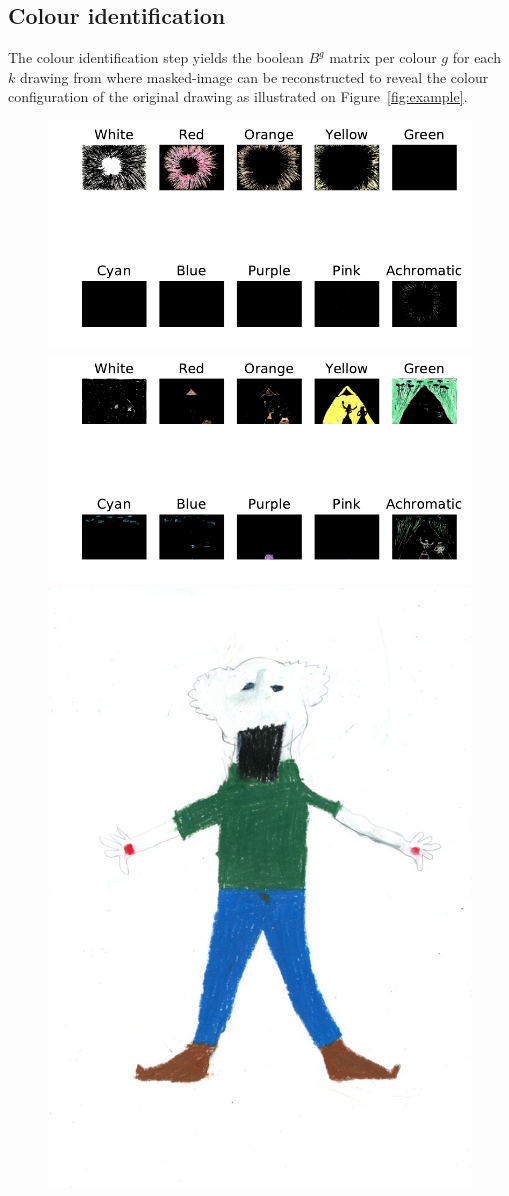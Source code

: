 \documentclass[11pt,a4paper]{article}
\begin{document}
\subsection{Colour identification}
\label{sec:results_identification}
The colour identification step yields the boolean $B^g$ matrix per colour $g$ for each $k$ drawing from where masked-image can be reconstructed to reveal the colour configuration of the original drawing as illustrated on Figure~\ref{fig:example}.

\begin{figure}
	\centering
	\includegraphics[width=0.62\linewidth]{figures/jp04_ko_m_ryx_13_09_kmx-rno_filter_mask.pdf}\hfil
	\includegraphics[width=0.62\linewidth]{figures/ru08_bo_f_pb_07_05_ali-rno_filter_mask.pdf}\hfil
	\includegraphics[width=0.32\linewidth]{figures/ch16_fr_m_rec_13_07_rap-r.jpg}

\end{figure}
\end{document}
